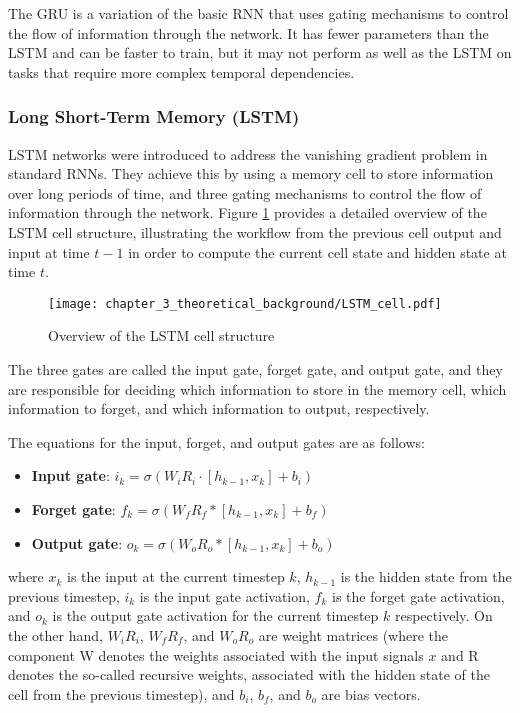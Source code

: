 The \ac{GRU} is a variation of the basic \ac{RNN} that uses gating mechanisms to control the flow of information through the network. It has fewer parameters than the \ac{LSTM} and can be faster to train, but it may not perform as well as the \ac{LSTM} on tasks that require more complex temporal dependencies.

\subsubsection{Long Short-Term Memory (LSTM)}
\label{subsubsec:3_LSTMs}

\ac{LSTM} networks were introduced to address the vanishing gradient problem in standard \acp{RNN}. They achieve this by using a memory cell to store information over long periods of time, and three gating mechanisms to control the flow of information through the network. Figure \ref{fig:chapter_3_theoretical_background/LSTM} provides a detailed overview of the \ac{LSTM} cell structure, illustrating the workflow from the previous cell output and input at time $t-1$ in order to compute the current cell state and hidden state at time $t$.

\begin{figure}[h]
	\centering
	\texttt{[image: chapter\_3\_theoretical\_background/LSTM\_cell.pdf]}
	\caption{Overview of the LSTM cell structure}
	\label{fig:chapter_3_theoretical_background/LSTM}
\end{figure}

The three gates are called the input gate, forget gate, and output gate, and they are responsible for deciding which information to store in the memory cell, which information to forget, and which information to output, respectively.

The equations for the input, forget, and output gates are as follows:

\begin{itemize}
	\item \textbf{Input gate}: $i_k = \sigma(W_i R_i \cdot [h_{k-1}, x_k] + b_i)$
	\item \textbf{Forget gate}: $f_k = \sigma(W_f R_f * [h_{k-1}, x_k] + b_f)$
	\item \textbf{Output gate}: $o_k = \sigma(W_o R_o * [h_{k-1}, x_k] + b_o)$
\end{itemize}

where $x_k$ is the input at the current timestep $k$, $h_{k-1}$ is the hidden state from the previous timestep, $i_k$ is the input gate activation, $f_k$ is the forget gate activation, and $o_k$ is the output gate activation for the current timestep $k$ respectively. On the other hand, $W_i R_i$, $W_f R_f$, and $W_o R_o$ are weight matrices (where the component W denotes the weights associated with the input signals $x$ and R denotes the so-called recursive weights, associated with the hidden state of the cell from the previous timestep), and $b_i$, $b_f$, and $b_o$ are bias vectors.

